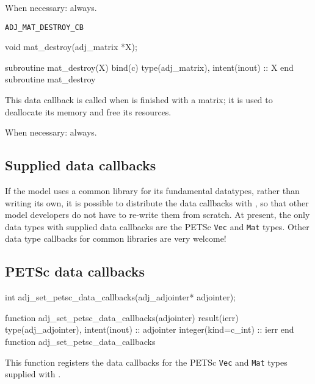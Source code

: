 When necessary: always.
\begin{boxwithtitle}{\texttt{ADJ_MAT_DESTROY_CB}}
\begin{minipage}{\columnwidth}
\begin{ccode}
  void mat_destroy(adj_matrix *X);
\end{ccode}
\begin{fortrancode}
  subroutine mat_destroy(X) bind(c)
    type(adj_matrix), intent(inout) :: X
  end subroutine mat_destroy
\end{fortrancode}
\end{minipage}
\end{boxwithtitle}
This data callback is called when \libadjoint is finished
with a matrix; it is used to deallocate its memory and free
its resources.

When necessary: always.
\subsection{Supplied data callbacks}
If the model uses a common library for its fundamental datatypes, rather than
writing its own, it is possible to distribute the data callbacks with \libadjoint,
so that other model developers do not have to re-write them from scratch. At present, the
only data types with supplied data callbacks are the PETSc \texttt{Vec} and \texttt{Mat} types.
Other data type callbacks for common libraries are very welcome!

\subsection{PETSc data callbacks} \label{sec:petsc_callbacks}
\begin{framed}
\begin{minipage}{\columnwidth}
\begin{ccode}
  int adj_set_petsc_data_callbacks(adj_adjointer* adjointer);
\end{ccode}
\begin{fortrancode}
  function adj_set_petsc_data_callbacks(adjointer) result(ierr)
    type(adj_adjointer), intent(inout) :: adjointer
    integer(kind=c_int) :: ierr
  end function adj_set_petsc_data_callbacks
\end{fortrancode}
\end{minipage}
\end{framed}
This function registers the data callbacks for the PETSc \texttt{Vec} and \texttt{Mat} types
supplied with \libadjoint.

